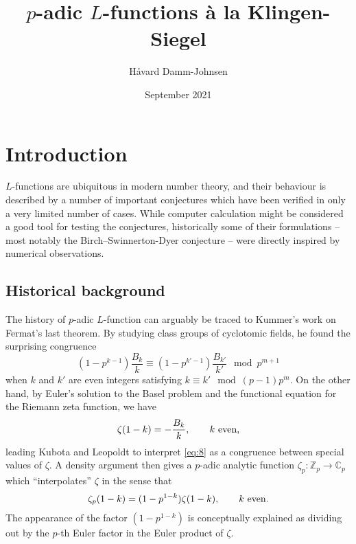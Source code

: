 \documentclass[11pt,a4paper]{article}
\newcommand{\Z}{\mathbb{Z}}
\newcommand{\C}{\mathbb{C}}
\theoremstyle{plain}
\theoremstyle{definition}
\theoremstyle{remark}
\numberwithin{equation}{section}
\begin{document}
\title{\vspace{-1cm} $p$-adic $L$-functions à la Klingen-Siegel}
\author{H\aa vard Damm-Johnsen}
\date{September 2021}
\maketitle

\localtableofcontents

\section{Introduction}
\label{sec:introduction}
$L$-functions are ubiquitous in modern number theory, and their
behaviour is described by a number of important conjectures which have
been verified in only a very limited number of cases. While computer
calculation might be considered a good tool for testing the
conjectures, historically some of their formulations -- most notably the
Birch--Swinnerton-Dyer conjecture -- were directly inspired by numerical
observations. 
\subsection{Historical background}
\label{sec:background}
The history of $p$-adic $L$-function can arguably be traced to
Kummer's work on Fermat's last theorem. By studying class groups of
cyclotomic fields, he found the surprising congruence
\begin{equation}
  \label{eq:8}
  (1-p^{k-1})\frac{B_{k}}{k} \equiv   (1-p^{k'-1})\frac{B_{k'}}{k'} \mod{p^{m+1}}
\end{equation}
when $k$ and $k'$ are even integers satisfying $k \equiv k' \mod{(p-1)p^{m}}$.
On the other hand, by Euler's solution to the Basel problem and the
functional equation for the Riemann zeta function, we have
\begin{equation}
  \label{eq:9}
  \zeta(1-k) =- \frac{B_{k}}{k}, \qq{} k \text{ even,}
\end{equation}
leading Kubota and Leopoldt to interpret \cref{eq:8} as a congruence
between special values of $\zeta$. A density argument then gives a
$p$-adic analytic function $\zeta_{p}\colon \Z_{p}\to \C_{p}$ which
``interpolates'' $\zeta$ in the sense that
\begin{equation}
  \label{eq:10}
  \zeta_{p}(1-k) = (1-p^{1-k})\zeta(1-k), \qq{} k\text{ even}.
\end{equation}
The appearance of the factor $(1-p^{1-k})$ is conceptually explained
as dividing out by the $p$-th Euler factor in the Euler product of
$\zeta$.
\end{document}

